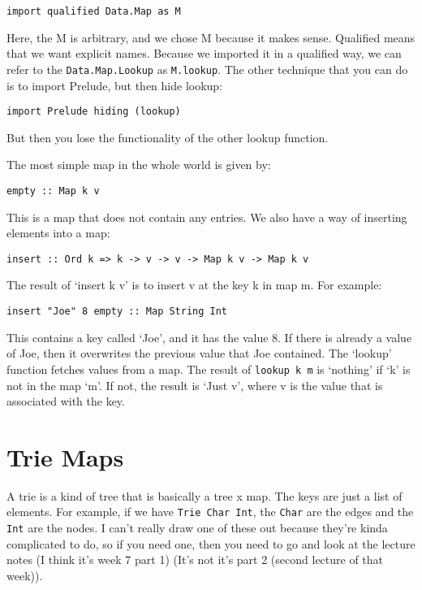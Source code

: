 \documentclass[11pt,a4paper,titlepage,dvipsnames,cmyk]{scrartcl}
\begin{document}
\begin{lstlisting}[style=B]
import qualified Data.Map as M
\end{lstlisting}

Here, the M is arbitrary, and we chose M because it makes sense. Qualified
means that we want explicit names. Because we imported it in a qualified
way, we can refer to the \lstinline|Data.Map.Lookup| as
\lstinline|M.lookup|. The other technique that you can do is to import
Prelude, but then hide lookup:
\begin{lstlisting}[style=B]
import Prelude hiding (lookup)
\end{lstlisting}

But then you lose the functionality of the other lookup function.

The most simple map in the whole world is given by:
\begin{lstlisting}[style=B]
empty :: Map k v
\end{lstlisting}

This is a map that does not contain any entries. We also have a way of
inserting elements into a map:

\begin{lstlisting}[style=B]
insert :: Ord k => k -> v -> v -> Map k v -> Map k v
\end{lstlisting}
The result of `insert k v' is to insert v at the key k in map m. For
example:
\begin{lstlisting}[style=B]
insert "Joe" 8 empty :: Map String Int
\end{lstlisting}

This contains a key called `Joe', and it has the value 8. If there is
already a value of Joe, then it overwrites the previous value that Joe
contained. The `lookup' function fetches values from a map. The result of
\lstinline|lookup k m| is `nothing' if `k' is not in the map `m'. If not,
the result is `Just v', where v is the value that is associated with the
key.

\section{Trie Maps}%
\label{sec:tries}
A trie is a kind of tree that is basically a tree x map. The keys are just
a list of elements. For example, if we have \lstinline|Trie Char Int|, the
\lstinline|Char| are the edges and the \lstinline|Int| are the nodes. I
can't really draw one of these out because they're kinda complicated to
do, so if you need one, then you need to go and look at the lecture notes
(I think it's week 7 part 1) (It's not it's part 2 (second lecture of that
week)).
\end{document}
